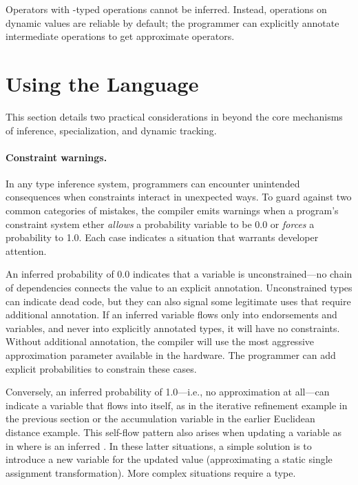 {Operators with -typed operations cannot be
inferred.
Instead, operations on dynamic values are reliable by default; the programmer
can explicitly annotate intermediate operations to get approximate operators.



\section{Using the Language}
\label{sec:practice}

This section details two practical considerations in \lang beyond the core
mechanisms of inference, specialization, and dynamic tracking.

\paragraph{Constraint warnings.}
\label{sec:warn}

In any type inference system, programmers can encounter unintended
consequences when constraints interact in unexpected ways.
To guard against two common categories of mistakes, the \lang compiler emits
warnings when a program's constraint system ether \emph{allows} a probability
variable to be 0.0 or \emph{forces} a probability to 1.0.
Each case indicates a situation that warrants developer attention.

An inferred probability of 0.0 indicates that a variable is unconstrained---no
chain of dependencies connects the value to an explicit annotation.
Unconstrained types can indicate dead code, but they can also signal some
legitimate uses that require additional annotation.
If an inferred variable flows only into endorsements and 
variables, and never into explicitly annotated types, it will have no
constraints.
Without additional annotation, the compiler will use the most aggressive
approximation parameter available in the hardware.
The programmer can add explicit probabilities to constrain these cases.

Conversely, an inferred probability of 1.0---i.e., no approximation at
all---can indicate a variable that flows into itself, as in the iterative
refinement example in the previous section or the  accumulation
variable in the earlier Euclidean distance example.
This self-flow pattern also arises when updating a variable as in
 where  is an inferred .
In these latter situations, a simple solution is to introduce a new
variable for the updated value (approximating a static single assignment
transformation).
More complex situations require a  type.


}
